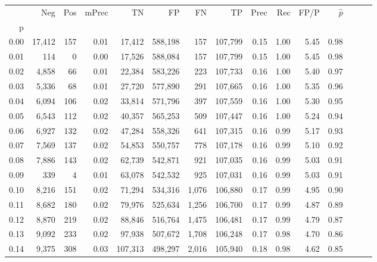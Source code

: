 \begin{tabular}{rrrrrrrrrrrrrrr}
\toprule
{} &     Neg &    Pos & mPrec &       TN &       FP &       FN &       TP &  Prec &   Rec &  FP/P & $\hat{p}$ \\
p    &         &        &       &          &          &          &          &       &       &       &           \\
\midrule
0.00 &  17,412 &    157 &  0.01 &   17,412 &  588,198 &      157 &  107,799 &  0.15 &  1.00 &  5.45 &      0.98 \\
0.01 &     114 &      0 &  0.00 &   17,526 &  588,084 &      157 &  107,799 &  0.15 &  1.00 &  5.45 &      0.98 \\
0.02 &   4,858 &     66 &  0.01 &   22,384 &  583,226 &      223 &  107,733 &  0.16 &  1.00 &  5.40 &      0.97 \\
0.03 &   5,336 &     68 &  0.01 &   27,720 &  577,890 &      291 &  107,665 &  0.16 &  1.00 &  5.35 &      0.96 \\
0.04 &   6,094 &    106 &  0.02 &   33,814 &  571,796 &      397 &  107,559 &  0.16 &  1.00 &  5.30 &      0.95 \\
0.05 &   6,543 &    112 &  0.02 &   40,357 &  565,253 &      509 &  107,447 &  0.16 &  1.00 &  5.24 &      0.94 \\
0.06 &   6,927 &    132 &  0.02 &   47,284 &  558,326 &      641 &  107,315 &  0.16 &  0.99 &  5.17 &      0.93 \\
0.07 &   7,569 &    137 &  0.02 &   54,853 &  550,757 &      778 &  107,178 &  0.16 &  0.99 &  5.10 &      0.92 \\
0.08 &   7,886 &    143 &  0.02 &   62,739 &  542,871 &      921 &  107,035 &  0.16 &  0.99 &  5.03 &      0.91 \\
0.09 &     339 &      4 &  0.01 &   63,078 &  542,532 &      925 &  107,031 &  0.16 &  0.99 &  5.03 &      0.91 \\
0.10 &   8,216 &    151 &  0.02 &   71,294 &  534,316 &    1,076 &  106,880 &  0.17 &  0.99 &  4.95 &      0.90 \\
0.11 &   8,682 &    180 &  0.02 &   79,976 &  525,634 &    1,256 &  106,700 &  0.17 &  0.99 &  4.87 &      0.89 \\
0.12 &   8,870 &    219 &  0.02 &   88,846 &  516,764 &    1,475 &  106,481 &  0.17 &  0.99 &  4.79 &      0.87 \\
0.13 &   9,092 &    233 &  0.02 &   97,938 &  507,672 &    1,708 &  106,248 &  0.17 &  0.98 &  4.70 &      0.86 \\
0.14 &   9,375 &    308 &  0.03 &  107,313 &  498,297 &    2,016 &  105,940 &  0.18 &  0.98 &  4.62 &      0.85 \\

\end{tabular}
